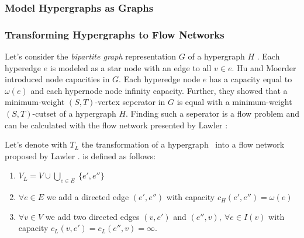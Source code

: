\subsubsection{Model Hypergraphs as Graphs}
\label{sec:hypergraph_to_graph}

\subsubsection{Transforming Hypergraphs to Flow Networks}
\label{sec:related_lawler}

Let's consider the \emph{bipartite graph} representation $G$ of a hypergraph $H$ \cite{HuMoerder85}.
Each hyperedge $e$ is modeled as a star node with an edge to all $v \in e$.
Hu and Moerder \cite{HuMoerder85} introduced node capacities in $G$. Each hyperedge
node $e$ has a capacity equal to $\omega(e)$ and each hypernode node infinity capacity. 
Further, they showed that a minimum-weight $(S,T)$-vertex seperator in $G$
is equal with a minimum-weight $(S,T)$-cutset of a hypergraph $H$. 
Finding such a seperator is a flow problem and can be calculated with the flow network  
presented by Lawler \cite{lawler1973}:

\begin{definition}
Let's denote with $T_L$ the transformation of a hypergraph \HypergraphDef~into 
a flow network  proposed by Lawler \cite{lawler1973}.  is defined as follows:
\begin{enumerate}
\item $V_L = V \cup \bigcup\limits_{e \in E}\ \{e', e''\}$
\item $\forall e \in E$ we add a directed edge $(e',e'')$ 
      with capacity $c_H(e',e'') = \omega(e)$
\item $\forall v \in V$ we add two directed edges $(v, e')$ and 
      $(e'', v),\ \forall e \in I(v)$ with 
      capacity $c_L(v, e') = c_L(e'',v) = \infty$.
\end{enumerate} 
\end{definition}

